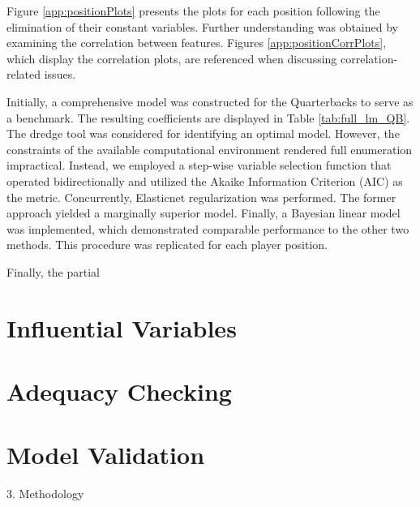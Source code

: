 Figure \ref{app:positionPlots} presents the plots for each position following the elimination of their constant variables. Further understanding was obtained by examining the correlation between features. Figures \ref{app:positionCorrPlots}, which display the correlation plots, are referenced when discussing correlation-related issues.

Initially, a comprehensive model was constructed for the Quarterbacks to serve as a benchmark. The resulting coefficients are displayed in Table \ref{tab:full_lm_QB}. 
The dredge tool was considered for identifying an optimal model. However, the constraints of the available computational environment rendered full enumeration impractical.
Instead, we employed a step-wise variable selection function that operated bidirectionally and 
utilized the Akaike Information Criterion (AIC) \cite{akaike1998} as the metric. 
Concurrently, Elasticnet regularization was performed. 
The former approach yielded a marginally superior model.
Finally, a Bayesian linear model was implemented, which demonstrated comparable performance to the other two methods.
This procedure was replicated for each player position.

Finally, the partial
















\section{Influential Variables}



\section{Adequacy Checking}

\section{Model Validation}









3. Methodology

